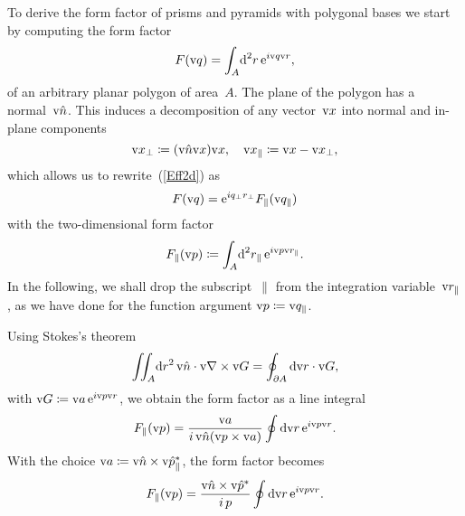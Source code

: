To derive the form factor of prisms and pyramids with polygonal bases
we start by computing the form factor
\begin{equation}\label{Eff2d}
  F(\text{v}{q})=\int_A\!\text{d}^2r\, \text{e}^{i\text{v}{q}\text{v}{r}},
\end{equation}
of an arbitrary planar polygon of area~$A$.
The plane of the polygon has a normal~$\text{v}{\hat n}$.
This induces a decomposition of any vector~$\text{v}{x}$ into normal
and in-plane components
\begin{equation}
  \text{v}{x}_\perp\coloneqq (\text{v}{\hat n}\text{v}{x})\text{v}{x},\quad
  \text{v}{x}_\parallel\coloneqq\text{v}{x}-\text{v}{x}_\perp,
\end{equation}
which allows us to rewrite~(\ref{Eff2d}) as
%
\begin{equation}
  F(\text{v}{q})=\text{e}^{iq_\perp r_\perp}F_\parallel(\text{v}{q}_\parallel)
\end{equation}
with the two-dimensional form factor
\begin{equation}
  F_\parallel(\text{v}{p})
  \coloneqq \int_A\!\text{d}^2r_\parallel\, \text{e}^{i\text{v}{p}\text{v}{r}_\parallel}.
\end{equation}
In the following, we shall drop the subscript~$\parallel$
from the integration variable~$\text{v}{r}_\parallel$,
as we have done for the function argument $\text{v}{p}\coloneqq\text{v}{q}_\parallel$.

Using Stokes's theorem
\begin{equation}
  \iint_A\!\text{d} r^2\,\text{v}{\hat n}\cdot\text{v}{\nabla}\times\text{v}{G} = \oint_{\partial A} \text{d}\text{v}{r}\cdot\text{v}{G},
\end{equation}
with $\text{v}{G}\coloneqq\text{v}{a}\, \text{e}^{i\text{v}{p}\text{v}{r}}$,
we obtain the form factor as a line integral
\begin{equation}
  F_\parallel(\text{v}{p})=\frac{\text{v}{a}}{i\, \text{v}{\hat n}(\text{v}{p}\times\text{v}{a})} \oint \text{d}\text{v}{r}\,\text{e}^{i\text{v}{p}\text{v}{r}}.
\end{equation}
With the choice $\text{v}{a}\coloneqq\text{v}{\hat n}\times\text{v}{\hat p}_\parallel^*$,
the form factor becomes
\begin{equation}\label{Elastoint}
  F_\parallel(\text{v}{p})=\frac{\text{v}{\hat n}\times\text{v}{\hat p}^*}{i\,p} \oint \text{d}\text{v}{r}\,\text{e}^{i\text{v}{p}\text{v}{r}}.
\end{equation}

